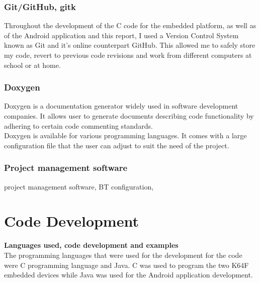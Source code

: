 \documentclass[12pt,a4paper]{article}
\begin{document}
            \subsubsection{Git/GitHub, gitk}
            Throughout the development of the C code for the embedded platform, as well as of the 
            Android application and this report, I used a Version Control System known as Git and 
            it's online counterpart GitHub. This allowed me to safely store my code, revert to 
            previous code revisions and work from different computers at school or at home.
            
            \subsubsection{Doxygen}
            Doxygen is a documentation generator widely used in software development companies. It
            allows user to generate documents describing code functionality by adhering 
            to certain code commenting standards.\\
            
            Doxygen is available for various programming languages. It comes with a large configuration 
            file that the user can adjust to suit the need of the project.
            
            \subsubsection{Project management software}
            project management software, BT configuration,
            \newpage
		
		\section{Code Development}
		{\bfseries Languages used, code development and examples}\\
		
		The programming languages that were used for the development for the code were C programming language and Java. C was used to program the two K64F embedded devices while Java was used for the Android application development.
		
\end{document}

